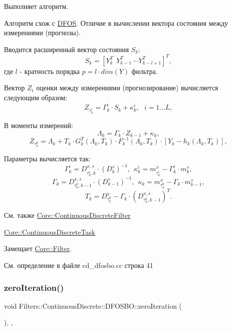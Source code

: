 Выполняет алгоритм. 

Алгоритм схож с \hyperlink{class_filters_1_1_continuous_discrete_1_1_d_f_o_s}{D\+F\+OS}. Отличие в вычислении вектора состояния между измерениями (прогнозы).

Вводится расширенный вектор состояния $S_k$\+: \[ S_k = [Y_k^T\ \ Y_{k-1}^T\ \cdots Y_{k-l+1}^T]^T,\] где $l$ -\/ кратность порядка $p = l \cdot dim(Y)$ фильтра.

Вектор $Z_t$ оценки между измерениями (прогнозирование) вычисляется следующим образом\+: \[Z_{\tau_k^i} = \Gamma_k^i \cdot S_k + \kappa_k^i,\ \ \ i = 1 \ldots L,\]

В моменты измерений\+: \[\Lambda_k = \Gamma_k \cdot Z_{k-1} + \kappa_k,\] \[Z_{\tau_k^0} = \Lambda_k + T_k \cdot G_k^T(\Lambda_k, T_k) \cdot F_k^{-1}(\Lambda_k, T_k) \cdot [Y_k - h_k(\Lambda_k, T_k)],\]

Параметры вычисляется так\+: \[\Gamma_k^i = D_{\tau_k^i,k}^{x,s} \cdot (D_k^s)^{-1},\ \ \kappa_k^i = m_{\tau_k^i}^x - \Gamma_k^i \cdot m_k^s,\] \[\Gamma_k = D_{\tau_k^0,k-1}^{x,s} \cdot (D_{k-1}^s)^{-1},\ \ \kappa_k = m_{\tau_k^0}^x - \Gamma_k \cdot m_{k-1}^s,\] \[T_k = D_{\tau_k^0}^x - \Gamma_k \cdot (D_{\tau_k^0,k-1}^{x,s})^T.\]

\begin{DoxySeeAlso}{См. также}
\hyperlink{class_core_1_1_continuous_discrete_filter}{Core\+::\+Continuous\+Discrete\+Filter} 

\hyperlink{class_core_1_1_continuous_discrete_task}{Core\+::\+Continuous\+Discrete\+Task} 
\end{DoxySeeAlso}


Замещает \hyperlink{class_core_1_1_filter_a438681ee3e54aba2148042d9f8011ab8}{Core\+::\+Filter}.



См. определение в файле cd\+\_\+dfosbo.\+cc строка 41

\hypertarget{class_filters_1_1_continuous_discrete_1_1_d_f_o_s_b_o_a958c75df5031558a244d553f13376e75}{}\label{class_filters_1_1_continuous_discrete_1_1_d_f_o_s_b_o_a958c75df5031558a244d553f13376e75} 
\subsubsection{\texorpdfstring{zero\+Iteration()}{zeroIteration()}}
{\footnotesize\ttfamily void Filters\+::\+Continuous\+Discrete\+::\+D\+F\+O\+S\+B\+O\+::zero\+Iteration (\begin{DoxyParamCaption}{ }\end{DoxyParamCaption})\hspace{0.3cm}{\ttfamily [override]}, {\ttfamily [protected]}, {\ttfamily [virtual]}}



